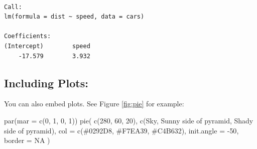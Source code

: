 \documentclass[
]{book}
\newenvironment{Shaded}{\begin{snugshade}}{\end{snugshade}}
\newcommand{\AttributeTok}[1]{\textcolor[rgb]{0.77,0.63,0.00}{#1}}
\newcommand{\ConstantTok}[1]{\textcolor[rgb]{0.00,0.00,0.00}{#1}}
\newcommand{\DecValTok}[1]{\textcolor[rgb]{0.00,0.00,0.81}{#1}}
\newcommand{\FunctionTok}[1]{\textcolor[rgb]{0.00,0.00,0.00}{#1}}
\newcommand{\NormalTok}[1]{#1}
\newcommand{\SpecialCharTok}[1]{\textcolor[rgb]{0.00,0.00,0.00}{#1}}
\newcommand{\StringTok}[1]{\textcolor[rgb]{0.31,0.60,0.02}{#1}}
\begin{document}
\begin{verbatim}

Call:
lm(formula = dist ~ speed, data = cars)

Coefficients:
(Intercept)        speed  
    -17.579        3.932  
\end{verbatim}

\hypertarget{including-plots}{%
\subsection{Including Plots:}\label{including-plots}}

You can also embed plots. See Figure \ref{fig:pie} for example:

\begin{Shaded}
\begin{Highlighting}[]
\FunctionTok{par}\NormalTok{(}\AttributeTok{mar =} \FunctionTok{c}\NormalTok{(}\DecValTok{0}\NormalTok{, }\DecValTok{1}\NormalTok{, }\DecValTok{0}\NormalTok{, }\DecValTok{1}\NormalTok{))}
\FunctionTok{pie}\NormalTok{(}
  \FunctionTok{c}\NormalTok{(}\DecValTok{280}\NormalTok{, }\DecValTok{60}\NormalTok{, }\DecValTok{20}\NormalTok{),}
  \FunctionTok{c}\NormalTok{(}\StringTok{\textquotesingle{}Sky\textquotesingle{}}\NormalTok{, }\StringTok{\textquotesingle{}Sunny side of pyramid\textquotesingle{}}\NormalTok{, }\StringTok{\textquotesingle{}Shady side of pyramid\textquotesingle{}}\NormalTok{),}
  \AttributeTok{col =} \FunctionTok{c}\NormalTok{(}\StringTok{\textquotesingle{}\#0292D8\textquotesingle{}}\NormalTok{, }\StringTok{\textquotesingle{}\#F7EA39\textquotesingle{}}\NormalTok{, }\StringTok{\textquotesingle{}\#C4B632\textquotesingle{}}\NormalTok{),}
  \AttributeTok{init.angle =} \SpecialCharTok{{-}}\DecValTok{50}\NormalTok{, }\AttributeTok{border =} \ConstantTok{NA}
\NormalTok{)}
\end{Highlighting}
\end{Shaded}
\end{document}
